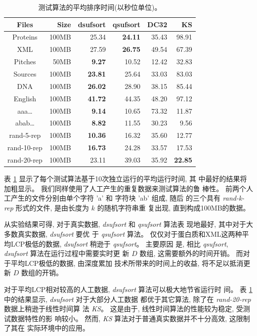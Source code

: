 \begin{table}[!htbp]
  \centering
  \renewcommand{\arraystretch}{1.5}
  \caption{测试算法的平均排序时间(以秒位单位)。}
  \begin{tabular}{|c|r|r|r|r|r|}
    \hline
    Files & Size   & dsufsort  & qsufsort & DC32  & KS\\
    \hline
    Proteins   & 100MB  & 25.34 &\textbf{24.11}    & 35.43 & 98.91\\
    XML        & 100MB  & 27.59 &\textbf{26.75}    & 49.54 & 67.39 \\
    Pitches    & 50MB   &\textbf{9.27 } & 10.52    & 12.42 & 32.83 \\
    Sources    & 100MB  &\textbf{23.81} & 25.64    & 33.03 & 83.03 \\
    DNA        & 100MB  &\textbf{26.02} & 28.90    & 38.15 & 85.44 \\
    English    & 100MB  &\textbf{41.72} & 44.35    & 48.20 & 97.12 \\
    \hline
    aaa\dots    & 100MB  &\textbf{9.14}  & 10.65 & 73.32 & 11.87\\
    abab\dots   & 100MB  &\textbf{8.82}  & 11.55 & 30.23 & 9.56\\
    rand-5-rep  & 100MB   &\textbf{10.36} & 16.32 & 35.60 & 12.77 \\
    rand-10-rep & 100MB   &\textbf{16.73} & 24.28 & 33.57 & 17.53 \\
    rand-20-rep & 100MB   & 23.11 & 39.03 & 35.92  & \textbf{22.85} \\
    \hline
  \end{tabular}
  \label{tab:time}
\end{table}

表 \ref{tab:time} 显示了每个测试算法基于10次独立运行的平均运行时间, 其
中最好的结果将加粗显示。 我们同样使用了人工产生的重复数据来测试算法的鲁
棒性。 前两个人工产生的文件分别由单个字符 'a' 和 字符块 'ab' 组成, 随后
的三个具有 \emph{rand-k-rep} 形式的文件, 是由长度为 $k$ 的随机字符串重
复出现, 直到构成100MB的数据。

从实验结果可得, 对于真实数据, \emph{dsufsort} 和 \emph{qsufsort} 算法表
现地最好, 其中对于大多数真实数据, \emph{dsufsort} 要优
于 \emph{qsufsort} 算法。 仅仅对于蛋白质和XML这两种平均LCP极低的数据,
\emph{dsufsort} 稍逊于 \emph{qsufsort}。 主要原因
是, 相比 \emph{qsufsort}, \emph{dsufsort} 算法在运行过程中需要实时更
新 $D$ 数组, 这需要额外的时间开销。 而对于平均LCP极低的数据, 由深度累加
技术所带来的时间上的收益, 将不足以抵消更新 $D$ 数组的开销。

对于平均LCP相对较高的人工数据, \emph{dsufsort} 算法可以极大地节省运行时
间。 表 \ref{tab:time} 中的结果显示, \emph{dsufsort} 对于大部分人工数据
都优于其它算法, 除了在 \emph{rand-20-rep} 数据上稍逊于线性时间算
法 \emph{KS}。 这是由于, 线性时间算法的性能较为稳定, 受测试数据特性的影
响较小。 然而, \emph{KS} 算法对于普通真实数据并不十分高效, 这限制了其在
实际环境中的应用。

